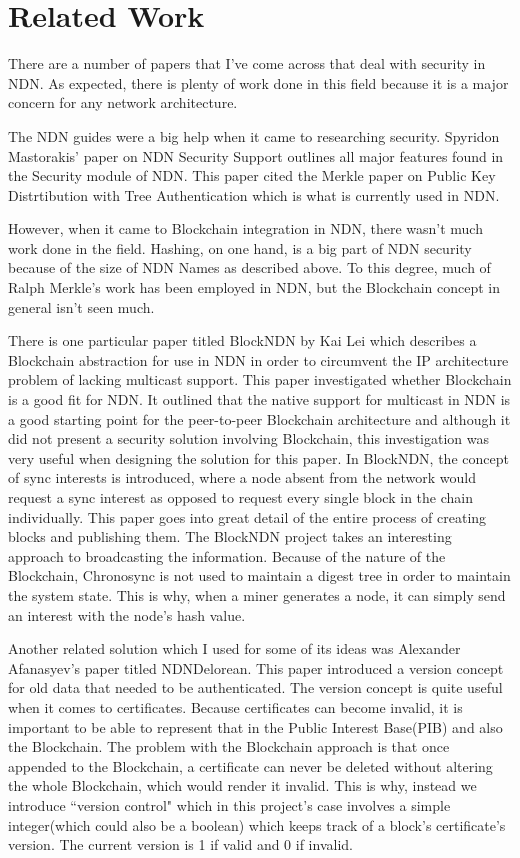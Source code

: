 \section{Related Work}
There are a number of papers that I've come across that deal with security in NDN. As expected, there is plenty of work done in this field because it is a major concern for any network architecture.\par 

The NDN guides were a big help when it came to researching security. Spyridon Mastorakis' paper on NDN Security Support outlines all major features found in the Security module of NDN. This paper cited the Merkle paper on Public Key Distrtibution with Tree Authentication which is what is currently used in NDN.\par



However, when it came to Blockchain integration in NDN, there wasn't much work done in the field. Hashing, on one hand, is a big part of NDN security because of the size of NDN Names as described above. To this degree, much of Ralph Merkle's work has been employed in NDN, but the Blockchain concept in general isn't seen much. 

There is one particular paper titled BlockNDN by Kai Lei which describes a Blockchain abstraction for use in NDN in order to circumvent the IP architecture problem of lacking multicast support. This paper investigated whether Blockchain is a good fit for NDN. It outlined that the native support for multicast in NDN is a good starting point for the peer-to-peer Blockchain architecture and although it did not present a security solution involving Blockchain, this investigation was very useful when designing the solution for this paper. In BlockNDN, the concept of sync interests is introduced, where a node absent from the network would request a sync interest as opposed to request every single block in the chain individually. This paper goes into great detail of the entire process of creating blocks and publishing them. The BlockNDN project takes an interesting approach to broadcasting the information. Because of the nature of the Blockchain, Chronosync is not used to maintain a digest tree in order to maintain the system state. This is why, when a miner generates a node, it can simply send an interest with the node's hash value. \par

Another related solution which I used for some of its ideas was Alexander Afanasyev's paper titled NDNDelorean. This paper introduced a version concept for old data that needed to be authenticated. The version concept is quite useful when it comes to certificates. Because certificates can become invalid, it is important to be able to represent that in the Public Interest Base(PIB) and also the Blockchain. The problem with the Blockchain approach is that once appended to the Blockchain, a certificate can never be deleted without altering the whole Blockchain, which would render it invalid. This is why, instead we introduce ``version control" which in this project's case involves a simple integer(which could also be a boolean) which keeps track of a block's certificate's version. The current version is 1 if valid and 0 if invalid.
